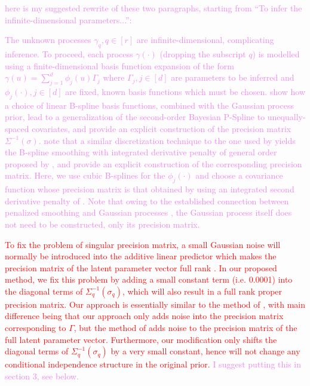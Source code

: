 \documentclass[ba]{imsart}
\newcommand{\highlight}[1]{\textcolor{red}{#1}}
\newcommand{\alex}[1]{\textcolor{violet}{{ }#1}}
\begin{document}
\alex{here is my suggested rewrite of these two paragraphs, starting from ``To infer the infinite-dimensional parameters...'':}

\alex{The unknown processes $\gamma_{q},q\in[r]$ are infinite-dimensional, complicating inference. To proceed, each process $\gamma(\cdot)$ (dropping the subscript $q$) is modelled using a finite-dimensional basis function expansion of the form $\gamma(u) = \sum_{j=1}^{d}\phi_{j}(u)\Gamma_{j}$ where $\Gamma_{j},j\in[d]$ are parameters to be inferred and $\phi_{j}(\cdot),j\in[d]$ are fixed, known basis functions which must be chosen. \cite{rw2} show how a choice of linear B-spline basis functions, combined with the Gaussian process prior, lead to a generalization of the second-order Bayesian P-Spline \citep{BayesianPspline} to unequally-spaced covariates, and provide an explicit construction of the precision matrix $\Sigma^{-1}(\sigma)$. \cite{adaptivesmoothingsplines} note that a similar discretization technique to the one used by \cite{rw2} yields the B-spline smoothing with integrated derivative penalty of general order proposed by \cite{osullivanspline}, and \cite{derivativepenalties} provide an explicit construction of the corresponding precision matrix. Here, we use cubic B-splines for the $\phi_{j}(\cdot)$ and choose a covariance function whose precision matrix is that obtained by using an integrated second derivative penalty of \cite{derivativepenalties}. Note that owing to the established connection between penalized smoothing and Gaussian processes \citep{spde,SPDEandPspline}, the Gaussian process itself does not need to be constructed, only its precision matrix.}

\highlight{To fix the problem of singular precision matrix, a small Gaussian noise will normally be introduced into the additive linear predictor which makes the precision matrix of the latent parameter vector full rank \citep{casecross,inla}. In our proposed method, we fix this problem by adding a small constant term (i.e. 0.0001) into the diagonal terms of $\Sigma_q^{-1}(\sigma_q)$, which will also result in a full rank proper precision matrix. Our approach is essentially similar to the method of \cite{casecross,inla}, with main difference being that our approach only adds noise into the precision matrix corresponding to $\Gamma$, but the method of \cite{casecross,inla} adds noise to the precision matrix of the full latent parameter vector. Furthermore, our modification only shifts the diagonal terms of $\Sigma_q^{-1}(\sigma_q)$ by a very small constant, hence will not change any conditional independence structure in the original prior.}\alex{I suggest putting this in section 3, see below.}
\end{document}
